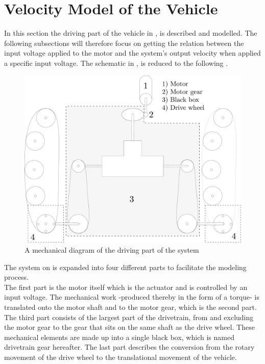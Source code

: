 \section{Velocity Model of the Vehicle}
In this section the driving part of the vehicle in ,  is described and modelled. The following subsections will therefore focus on getting the relation between the input voltage applied to the motor and the system's output velocity when applied a specific input voltage. The schematic in ,  is reduced to the following .

\begin{figure}[H]
	\centering
	\includegraphics[scale=0.2]{figures/vehicleDescriptionDriveTrainBlackBox.pdf}
	\caption{A mechanical diagram of the driving part of the system}
	\label{fig:vehicleDescriptionDriveTrainBlackBox}
\end{figure}

The system on  is expanded into four different parts to facilitate the modeling process.\\
The first part is the motor itself which is the actuator and is controlled by an input voltage. The mechanical work -produced thereby in the form of a torque- is translated onto the motor shaft and to the motor gear, which is the second part.
The third part consists of the largest part of the drivetrain, from and excluding the motor gear to the gear that sits on the same shaft as the drive wheel. These mechanical elements are made up into a single black box, which is named drivetrain gear hereafter.
The last part describes the conversion from the rotary movement of the drive wheel to the translational movement of the vehicle.

